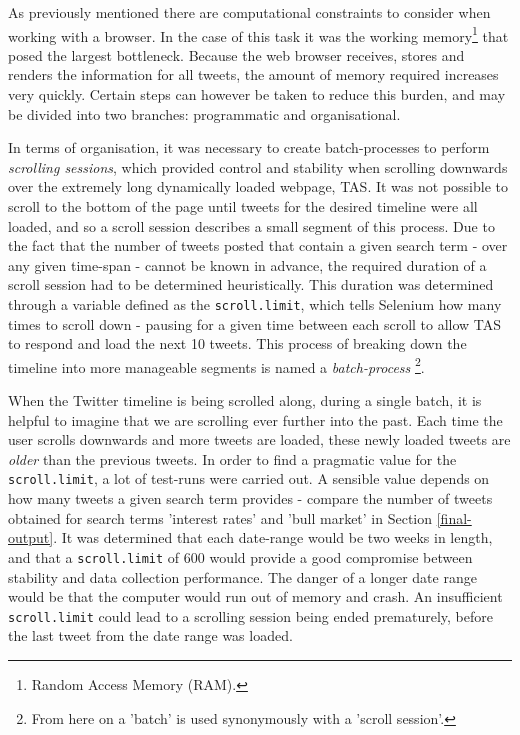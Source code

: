 \documentclass{article}
\begin{document}
As previously mentioned there are computational constraints to consider when working with a browser. In the case of this task it was the working memory\footnote{Random Access Memory (RAM).} that posed the largest bottleneck. Because the web browser receives, stores and renders the information for all tweets, the amount of memory required increases very quickly. Certain steps can however be taken to reduce this burden, and may be divided into two branches: programmatic and organisational.

In terms of organisation, it was necessary to create batch-processes to perform \emph{scrolling sessions}, which provided control and stability when scrolling downwards over the extremely long dynamically loaded webpage, TAS. It was not possible to scroll to the bottom of the page until tweets for the desired timeline were all loaded, and so a scroll session describes a small segment of this process. Due to the fact that the number of tweets posted that contain a given search term - over any given time-span - cannot be known in advance, the required duration of a scroll session had to be determined heuristically. This duration was determined through a variable defined as the \texttt{scroll.limit}, which tells Selenium how many times to scroll down - pausing for a given time between each scroll to allow TAS to respond and load the next 10 tweets. This process of breaking down the timeline into more manageable segments is named a \emph{batch-process} \footnote{From here on a 'batch' is used synonymously with a 'scroll session'.}.

When the Twitter timeline is being scrolled along, during a single batch, it is helpful to imagine that we are scrolling ever further into the past. Each time the user scrolls downwards and more tweets are loaded, these newly loaded tweets are \emph{older} than the previous tweets.
In order to find a pragmatic value for the \texttt{scroll.limit}, a lot of test-runs were carried out. A sensible value depends on how many tweets a given search term provides - compare the number of tweets obtained for search terms 'interest rates' and 'bull market' in Section \ref{final-output}. It was determined that each date-range would be two weeks in length, and that a \texttt{scroll.limit} of 600 would provide a good compromise between stability and data collection performance. The danger of a longer date range would be that the computer would run out of memory and crash. An insufficient \texttt{scroll.limit} could lead to a scrolling session being ended prematurely, before the last tweet from the date range was loaded.
\end{document}
